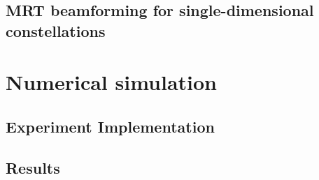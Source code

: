 \documentclass[11pt]{article}
\begin{document}
        \subsection{MRT beamforming for single-dimensional constellations}\label{sec:mrt_wl_sinr}
            
    \section{Numerical simulation}
        \subsection{Experiment Implementation}
            
        \subsection{Results}
            
    \newpage	
 	\begingroup
 		\renewcommand{\section}[2]{}%
 		
 		
 	\endgroup
\end{document}

